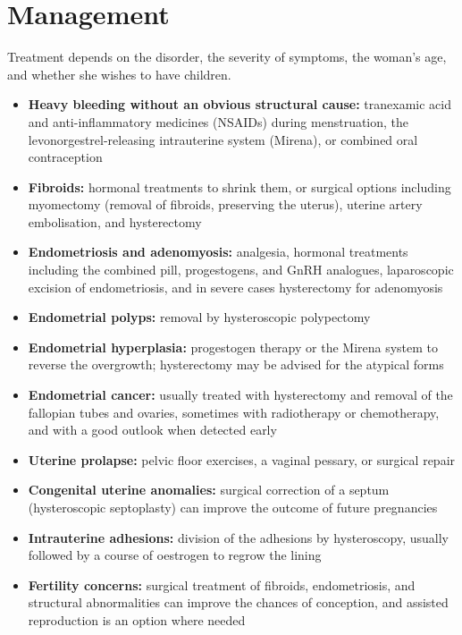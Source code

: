 \section*{Management}
Treatment depends on the disorder, the severity of symptoms, the woman's age, and whether she wishes to have children.

\begin{itemize}
    \item \textbf{Heavy bleeding without an obvious structural cause:} tranexamic acid and anti-inflammatory medicines (NSAIDs) during menstruation, the levonorgestrel-releasing intrauterine system (Mirena), or combined oral contraception
    \item \textbf{Fibroids:} hormonal treatments to shrink them, or surgical options including myomectomy (removal of fibroids, preserving the uterus), uterine artery embolisation, and hysterectomy
    \item \textbf{Endometriosis and adenomyosis:} analgesia, hormonal treatments including the combined pill, progestogens, and GnRH analogues, laparoscopic excision of endometriosis, and in severe cases hysterectomy for adenomyosis
    \item \textbf{Endometrial polyps:} removal by hysteroscopic polypectomy
    \item \textbf{Endometrial hyperplasia:} progestogen therapy or the Mirena system to reverse the overgrowth; hysterectomy may be advised for the atypical forms
    \item \textbf{Endometrial cancer:} usually treated with hysterectomy and removal of the fallopian tubes and ovaries, sometimes with radiotherapy or chemotherapy, and with a good outlook when detected early
    \item \textbf{Uterine prolapse:} pelvic floor exercises, a vaginal pessary, or surgical repair
    \item \textbf{Congenital uterine anomalies:} surgical correction of a septum (hysteroscopic septoplasty) can improve the outcome of future pregnancies
    \item \textbf{Intrauterine adhesions:} division of the adhesions by hysteroscopy, usually followed by a course of oestrogen to regrow the lining
    \item \textbf{Fertility concerns:} surgical treatment of fibroids, endometriosis, and structural abnormalities can improve the chances of conception, and assisted reproduction is an option where needed
\end{itemize}

